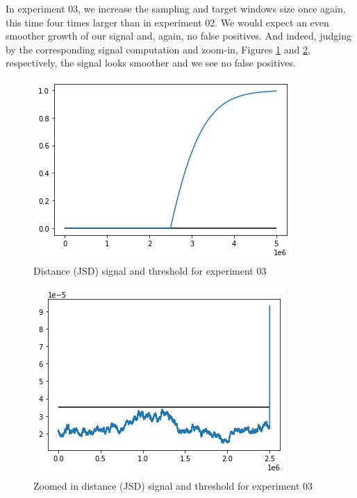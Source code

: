 In experiment 03, we increase the sampling and target windows size once again, this time four times larger than in experiment 02. We would expect an even smoother growth of our signal and, again, no false positives. And indeed, judging by the corresponding signal computation and zoom-in, Figures \ref{fig:JSD-signal-03} and \ref{fig:JSD-signal-zoom-03}, respectively, the signal looks smoother and we see no false positives.
\begin{figure}[!htb]
    \begin{center}
      \includegraphics[scale=0.6]{figures/stream-analysis-viz-250000.png}
      \caption[]{Distance (JSD) signal and threshold for experiment 03}
      \label{fig:JSD-signal-03}
    \end{center}
\end{figure}
\begin{figure}[!htb]
    \begin{center}
      \includegraphics[scale=0.6]{figures/stream-analysis-viz-zoom-250000.png}
      \caption[]{Zoomed in distance (JSD) signal and threshold for experiment 03}
      \label{fig:JSD-signal-zoom-03}
    \end{center}
\end{figure}


